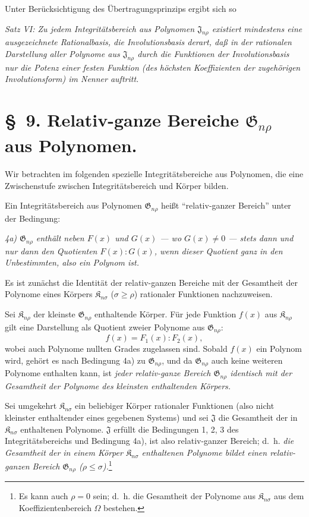 \documentclass[11pt]{article}
\providecommand{\Kfield}{\mathfrak{K}}
\providecommand{\Jdom}{\mathfrak{J}}
\providecommand{\Gdom}{\mathfrak{G}}
\begin{document}
Unter Berücksichtigung des Übertragungsprinzips ergibt sich so

\emph{Satz VI: Zu jedem Integritätsbereich aus Polynomen $\Jdom_{n\rho}$ existiert mindestens eine ausgezeichnete Rationalbasis, die Involutionsbasis derart, daß in der rationalen Darstellung aller Polynome aus $\Jdom_{n\rho}$ durch die Funktionen der Involutionsbasis nur die Potenz einer festen Funktion (des höchsten Koeffizienten der zugehörigen Involutionsform) im Nenner auftritt.}

\section*{\S\ 9. Relativ-ganze Bereiche $\Gdom_{n\rho}$ aus Polynomen.}

Wir betrachten im folgenden spezielle Integritätsbereiche aus Polynomen, die eine Zwischenstufe zwischen Integritätsbereich und Körper bilden.

Ein Integritätsbereich aus Polynomen $\Gdom_{n\rho}$ heißt ``relativ-ganzer Bereich'' unter der Bedingung:

\emph{4a) $\Gdom_{n\rho}$ enthält neben $F(x)$ und $G(x)$ --- wo $G(x)\ne0$ --- stets dann und nur dann den Quotienten $F(x):G(x)$, wenn dieser Quotient ganz in den Unbestimmten, also ein Polynom ist.}

Es ist zunächst die Identität der relativ-ganzen Bereiche mit der Gesamtheit der Polynome eines Körpers $\Kfield_{n\sigma}$ ($\sigma\ge \rho$) rationaler Funktionen nachzuweisen.

Sei $\Kfield_{n\rho}$ der kleinste $\Gdom_{n\rho}$ enthaltende Körper. Für jede Funktion $f(x)$ aus $\Kfield_{n\rho}$ gilt eine Darstellung als Quotient zweier Polynome aus $\Gdom_{n\rho}$:
\[
  f(x)=F_1(x):F_2(x),
\]
wobei auch Polynome nullten Grades zugelassen sind. Sobald $f(x)$ ein Polynom wird, gehört es nach Bedingung 4a) zu $\Gdom_{n\rho}$, und da $\Gdom_{n\rho}$ auch keine weiteren Polynome enthalten kann, ist \emph{jeder relativ-ganze Bereich $\Gdom_{n\rho}$ identisch mit der Gesamtheit der Polynome des kleinsten enthaltenden Körpers.}

Sei umgekehrt $\Kfield_{n\sigma}$ ein beliebiger Körper rationaler Funktionen (also nicht kleinster enthaltender eines gegebenen Systems) und sei $\Jdom$ die Gesamtheit der in $\Kfield_{n\sigma}$ enthaltenen Polynome. $\Jdom$ erfüllt die Bedingungen 1, 2, 3 des Integritätsbereichs und Bedingung 4a), ist also relativ-ganzer Bereich; d.~h. \emph{die Gesamtheit der in einem Körper $\Kfield_{n\sigma}$ enthaltenen Polynome bildet einen relativ-ganzen Bereich $\Gdom_{n\rho}$ ($\rho\le\sigma$).}\footnote{Es kann auch $\rho=0$ sein; d.~h. die Gesamtheit der Polynome aus $\Kfield_{n\sigma}$ aus dem Koeffizientenbereich $\Omega$ bestehen.}
\end{document}

